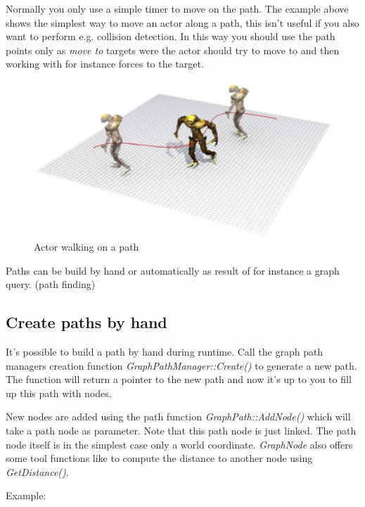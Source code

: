 Normally you only use a simple timer to move on the path. The example above shows the simplest way to move an actor along a path, this isn't useful if you also want to perform e.g. collision detection. In this way you should use the path points only as \emph{move to} targets were the actor should try to move to and then working with for instance forces to the target.

\begin{figure}
  \begin{center}
    \includegraphics{pics/Paths.eps}
  \end{center}
  \caption{Actor walking on a path}
  \label{fig:Actor walking on a path}
\end{figure}

Paths can be build by hand or automatically as result of for instance a graph query. (path finding)


\subsection{Create paths by hand}
It's possible to build a path by hand during runtime. Call the graph path managers creation function \emph{GraphPathManager::Create()} to generate a new path. The function will return a pointer to the new path and now it's up to you to fill up this path with nodes.

New nodes are added using the path function \emph{GraphPath::AddNode()} which will take a path node as parameter. Note that this path node is just linked. The path node itself is in the simplest case only a world coordinate. \emph{GraphNode} also offers some tool functions like to compute the distance to another node using \emph{GetDistance()}.

Example:

